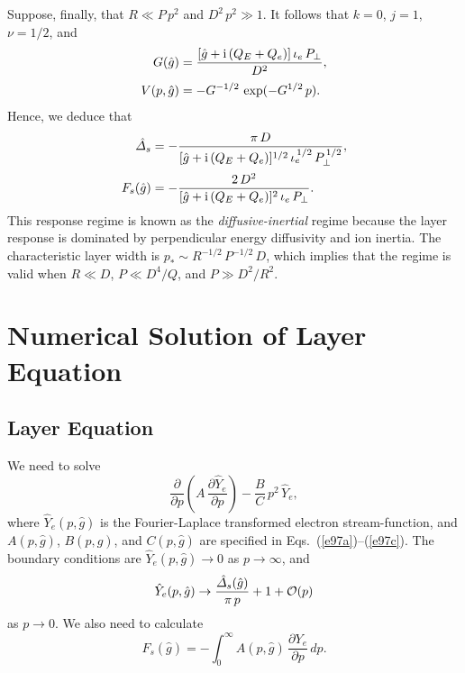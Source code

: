 \documentclass[12pt,prb,aps]{revtex4-1}
\begin{document}
Suppose, finally, that $R\ll P\,p^2$ and $D^2\,p^2\gg 1$. It follows that $k=0$, $j=1$, $\nu=1/2$, and
\begin{align}
G(\hat{g}) &= \frac{[\hat{g}+{\rm i}\,(Q_E+Q_e)]\,\iota_e\,P_\perp}{D^2},\\[0.5ex]
V(p,\hat{g})&= -G^{-1/2}\,\exp(-G^{1/2}\,p).
\end{align}
Hence, we deduce that
\begin{align}\label{edia}
\hat{\mit\Delta}_s&= -\frac{\pi\,D}{[\hat{g}+{\rm i}\,(Q_E+Q_e)]^{1/2}\,\iota_e^{\,1/2}\,P_\perp^{\,1/2}},\\[0.5ex]
F_s(\hat{g}) &= - \frac{2\,D^2}{[\hat{g}+{\rm i}\,(Q_E+Q_e)]^2\,\iota_e\,P_\perp}.\label{edib}
\end{align}
This response regime is known as the {\em diffusive-inertial}\/ regime because the
layer response is dominated by perpendicular energy diffusivity and ion inertia. \cite{err3} The characteristic layer width is $p_\ast\sim
R^{-1/2}\,P^{-1/2}\,D$, which implies that the regime is valid when $R\ll D$, $P\ll D^4/Q$, and $P\gg D^2/R^2$. 

\section{Numerical Solution of Layer Equation}\label{appd}

\subsection{Layer Equation}
We need to solve
\begin{equation}\label{e83}
\frac{\partial}{\partial p}\!\left(A\,\frac{\partial\hat{Y}_e}{\partial p}\right) - \frac{B}{C}\,p^2\,\hat{Y}_e,
\end{equation}
where $\hat{Y}_e(p,\hat{g})$ is the Fourier-Laplace transformed electron stream-function, and $A(p,\hat{g})$, $B(p,\hat{g})$,
and $C(p,\hat{g})$ are specified in Eqs.~(\ref{e97a})--(\ref{e97c}). 
The boundary conditions are $\hat{Y}_e(p,\hat{g})\rightarrow 0$ as $p\rightarrow\infty$, and
\begin{equation}\label{esmall}
\hat{Y}_e(p,\hat{g})\rightarrow  \frac{\hat{\mit\Delta}_s(\hat{g})}{\pi\,p}+ 1+{\cal O}(p)
\end{equation}
as $p\rightarrow 0$. We also need to calculate
\begin{equation}
F_s(\hat{g}) = -\int_0^\infty A(p,\hat{g})\,\frac{\partial Y_e}{\partial p}\,dp.
\end{equation}
\end{document}
